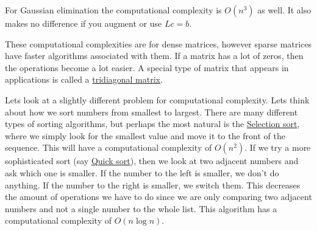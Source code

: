 \documentclass[reqno]{amsart}
\theoremstyle{definition}
\begin{document}
For Gaussian elimination the computational complexity is $O(n^3)$ as well.  It also makes no difference if you augment or use $Lc = b$.

These computational complexities are for dense matrices, however sparse matrices have faster algorithms associated with them.  If a matrix has a lot of zeros, then the operations become a lot easier.  A special type of matrix that appears in applications is called a \underline{tridiagonal matrix}.

Lets look at a slightly different problem for computational complexity.  Lets think about how we sort numbers from smallest to largest.  There are many different types of sorting algorithms, but perhaps the most natural is the \underline{Selection sort}, where we simply look for the smallest value and move it to the front of the sequence.  This will have a computational complexity of $O(n^2)$.  If we try a more sophisticated sort (say \underline{Quick sort}), then we look at two adjacent numbers and ask which one is smaller.  If the number to the left is smaller, we don't do anything.  If the number to the right is smaller, we switch them.  This decreases the amount of operations we have to do since we are only comparing two adjacent numbers and not a single number to the whole list.  This algorithm has a computational complexity of $O(n\log n)$.
\end{document}
